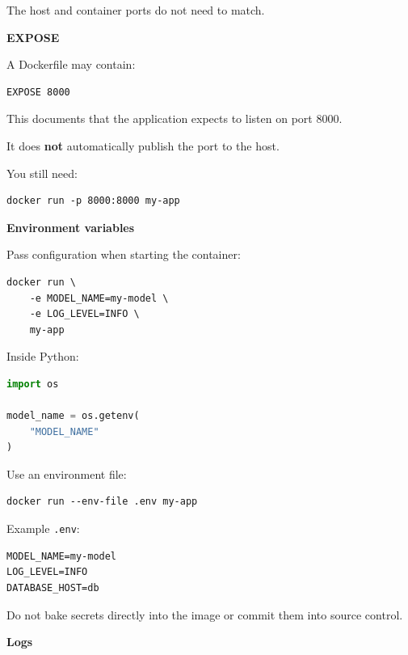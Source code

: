 \documentclass[11pt,letterpaper]{article}
\begin{document}
The host and container ports do not need to match.

\textbf{EXPOSE}

A Dockerfile may contain:

\begin{lstlisting}
EXPOSE 8000
\end{lstlisting}

This documents that the application expects to listen on port 8000.

It does \textbf{not} automatically publish the port to the host.

You still need:

\begin{lstlisting}
docker run -p 8000:8000 my-app
\end{lstlisting}



\textbf{Environment variables}

Pass configuration when starting the container:

\begin{lstlisting}
docker run \
    -e MODEL_NAME=my-model \
    -e LOG_LEVEL=INFO \
    my-app
\end{lstlisting}

Inside Python:

\begin{lstlisting}[language=Python]
import os

model_name = os.getenv(
    "MODEL_NAME"
)
\end{lstlisting}

Use an environment file:

\begin{lstlisting}
docker run --env-file .env my-app
\end{lstlisting}

Example \texttt{.env}:

\begin{lstlisting}
MODEL_NAME=my-model
LOG_LEVEL=INFO
DATABASE_HOST=db
\end{lstlisting}

Do not bake secrets directly into the image or commit them into source
control.



\textbf{Logs}
\end{document}
